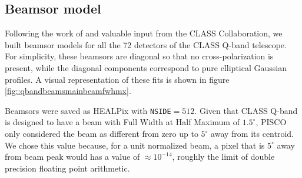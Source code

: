 \documentclass[a4paper,fleqn]{cas-dc}\sloppy
\begin{document}
\subsection{Beamsor model}

Following the work of \cite{2012SPIE.8452E..20E} and valuable input from the CLASS Collaboration, we built beamsor models for all the 72 detectors of the CLASS Q-band telescope. For simplicity, these beamsors are diagonal so that no cross-polarization is present, while the diagonal components correspond to pure elliptical Gaussian profiles. A visual representation of these fits is shown in figure \ref{fig::qbandbeamsmainbeamfwhmx}.

Beamsors were saved as HEALPix with \texttt{NSIDE}$=512$. Given that CLASS Q-band is designed to have a beam with Full Width at Half Maximum of $1.5^\circ$, PISCO only considered the beam as different from zero up to $5^\circ$ away from its centroid. We chose this value because, for a unit normalized beam, a pixel that is $5^\circ$ away from beam peak would has a value of $\approx 10^{-14}$, roughly the limit of double precision floating point arithmetic. 
\end{document}
